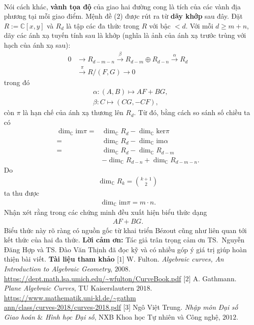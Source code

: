 \begin{multicols}{2}
\begin{align*}
	\end{align*}
	Nói cách khác, {\bf\color{duongvaotoanhoc} vành tọa độ} của giao hai đường cong là tích của các vành địa phương tại mỗi giao điểm.
	\vskip 0.1cm
	Mệnh đề ($2$) được rút ra từ  \textbf{\color{duongvaotoanhoc}dãy khớp}  sau đây. Đặt $R:=\mathbb C[x,y]$ và $R_d$ là tập các đa thức trong $R$ với bậc $<d$.
	Với mỗi $d\geq m+n$, dãy các ánh xạ tuyến tính sau là khớp (nghĩa là ảnh của ánh xạ trước trùng với hạch của ánh xạ sau):
	\begin{align*}
		0&\longrightarrow R_{d-m-n}\stackrel\beta\longrightarrow 
		R_{d-m}\oplus R_{d-n} \stackrel\alpha\longrightarrow R_d\\
		&\stackrel\pi\longrightarrow R/(F,G)\longrightarrow 0	
	\end{align*}
	trong đó  
	\begin{align*}
		&\alpha: (A,B)\longmapsto AF+BG,\\
		&\beta: C\longmapsto (CG,-CF),
	\end{align*}
	còn $\pi$ là hạn chế của ánh xạ thương lên $R_d$. Từ đó, bằng cách so sánh số chiều ta có 
	\begin{align*} \dim_{\mathbb C}\textrm{im}\pi=&\dim_{\mathbb C}R_d-\dim_{\mathbb C}\textrm{ker}\pi\\
		=& \dim_{\mathbb C}R_d-\dim_{\mathbb C}\textrm{im}\alpha\\
		=& \dim_{\mathbb C}R_d-\dim_{\mathbb C}R_{d-m}\\
		&-\dim_{\mathbb C}R_{d-n}+ 
		\dim_{\mathbb C}R_{d-m-n}.
	\end{align*}
	Do
	\begin{align*}
		\dim_{\mathbb C}R_k={k+1\choose 2}
	\end{align*}
	ta thu được 
	\begin{align*}
		\dim_{\mathbb C}\textrm{im}\pi=  m\cdot n.
	\end{align*}
	Nhận xét rằng trong các chứng minh đều xuất hiện biểu thức dạng
	\begin{align*}
		AF+BG.
	\end{align*}
	Biểu thức này rõ ràng có nguồn gốc từ khai triển Bézout cũng như liên quan tới kết thức của hai đa thức. 
	\vskip 0.1cm
	\textbf{\color{duongvaotoanhoc}Lời cảm ơn:} Tác giả trân trọng cảm ơn TS.~Nguyễn Đăng Hợp và TS. Đào Văn Thịnh đã đọc kỹ và có nhiều góp ý giá trị giúp hoàn thiện bài viết.  
	\vskip 0.1cm
	\textbf{\color{duongvaotoanhoc}Tài liệu tham khảo}
	\vskip 0.1cm
	[$1$]  W. Fulton. {\em Algebraic curves, An Introduction to Algebraic Geometry}, $2008$.\\
	\url{https://dept.math.lsa.umich.edu/~wfulton/CurveBook.pdf}
	\vskip 0.1cm
	[$2$]  A. Gathmann. {\em Plane Algebraic Curves}, TU Kaiserslautern $2018$.\\ 
	\url{https://www.mathematik.uni-kl.de/~gathm}\\ \url{ann/class/curves-2018/curves-2018.pdf}
	\vskip 0.1cm	
	[$3$] Ngô Việt Trung. {\em Nhập môn Đại số Giao hoán $\&$ Hình học Đại số}, NXB Khoa học Tự nhiên và Công nghệ, $2012$.
\end{multicols}